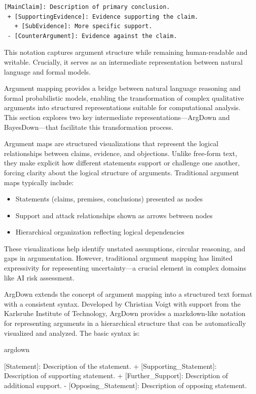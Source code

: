 \documentclass[
  11pt,
  letterpaper,
]{book}
\newenvironment{Shaded}{\begin{snugshade}}{\end{snugshade}}
\newcommand{\CommentTok}[1]{\textcolor[rgb]{0.37,0.37,0.37}{#1}}
\newcommand{\NormalTok}[1]{\textcolor[rgb]{0.00,0.23,0.31}{#1}}
\newcommand{\OtherTok}[1]{\textcolor[rgb]{0.00,0.23,0.31}{#1}}
\newcommand{\SpecialStringTok}[1]{\textcolor[rgb]{0.13,0.47,0.30}{#1}}
\providecommand{\tightlist}{%
  \setlength{\itemsep}{0pt}\setlength{\parskip}{0pt}}
\begin{document}
\begin{verbatim}
[MainClaim]: Description of primary conclusion.
 + [SupportingEvidence]: Evidence supporting the claim.
   + [SubEvidence]: More specific support.
 - [CounterArgument]: Evidence against the claim.
\end{verbatim}

This notation captures argument structure while remaining human-readable
and writable. Crucially, it serves as an intermediate representation
between natural language and formal models.

Argument mapping provides a bridge between natural language reasoning
and formal probabilistic models, enabling the transformation of complex
qualitative arguments into structured representations suitable for
computational analysis. This section explores two key intermediate
representations---ArgDown and BayesDown---that facilitate this
transformation process.

Argument maps are structured visualizations that represent the logical
relationships between claims, evidence, and objections. Unlike free-form
text, they make explicit how different statements support or challenge
one another, forcing clarity about the logical structure of arguments.
Traditional argument maps typically include:

\begin{itemize}
\tightlist
\item
  Statements (claims, premises, conclusions) presented as nodes
\item
  Support and attack relationships shown as arrows between nodes
\item
  Hierarchical organization reflecting logical dependencies
\end{itemize}

These visualizations help identify unstated assumptions, circular
reasoning, and gaps in argumentation. However, traditional argument
mapping has limited expressivity for representing uncertainty---a
crucial element in complex domains like AI risk assessment.

ArgDown extends the concept of argument mapping into a structured text
format with a consistent syntax. Developed by Christian Voigt with
support from the Karlsruhe Institute of Technology, ArgDown provides a
markdown-like notation for representing arguments in a hierarchical
structure that can be automatically visualized and analyzed. The basic
syntax is:

argdown

\begin{Shaded}
\begin{Highlighting}[]
\OtherTok{[Statement]: }\NormalTok{Description of the statement.}
\SpecialStringTok{ + }\CommentTok{[}\OtherTok{Supporting\_Statement}\CommentTok{]}\NormalTok{: Description of supporting statement.}
\SpecialStringTok{   + }\CommentTok{[}\OtherTok{Further\_Support}\CommentTok{]}\NormalTok{: Description of additional support.}
\SpecialStringTok{ {-} }\CommentTok{[}\OtherTok{Opposing\_Statement}\CommentTok{]}\NormalTok{: Description of opposing statement.}
\end{Highlighting}
\end{Shaded}
\end{document}
